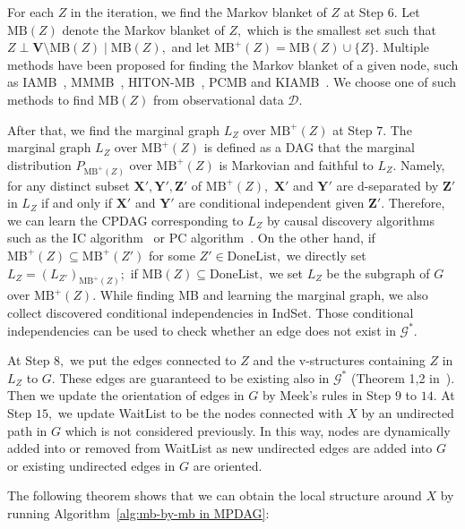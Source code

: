 \documentclass{article}
\begin{document}
For each $Z$ in the iteration, we find the Markov blanket of $Z$ at Step $6.$ Let $\mathrm{MB}(Z)$ denote the Markov blanket of $Z,$ which is the smallest set such that $Z\perp \mathbf{V}\setminus \mathrm{MB}(Z)\mid \mathrm{MB}(Z),$ and let $\mathrm{MB}^+(Z)=\mathrm{MB}(Z)\cup \{Z\}.$
Multiple methods have been proposed for finding the Markov blanket of a given node, such as IAMB~\citep{tsamardinos2003algorithms}, MMMB~\citep{tsamardinos2003time}, HITON-MB~\citep{aliferis2003hiton}, PCMB and KIAMB~\citep{pena2007towards}.
We choose one of such methods to find $\mathrm{MB}(Z)$ from observational data $\mathcal{D}.$

After that, we find the marginal graph $L_Z$ over $\mathrm{MB}^+(Z)$ at Step $7.$
The marginal graph $L_Z$ over $\mathrm{MB}^+(Z)$ is defined as a DAG that the marginal distribution $P_{\mathrm{MB}^+(Z)}$ over $\mathrm{MB}^+(Z)$ is Markovian and faithful to $L_Z.$
Namely, for any distinct subset $\mathbf{X}',\mathbf{Y}',\mathbf{Z}'$ of $\mathrm{MB}^+(Z),$ $\mathbf{X}'$ and $\mathbf{Y}'$ are d-separated by $\mathbf{Z}'$ in $L_Z$ if and only if $\mathbf{X}'$ and $\mathbf{Y}'$ are conditional independent given $\mathbf{Z}'$.
Therefore, we can learn the CPDAG corresponding to $L_Z$ by causal discovery algorithms such as the IC algorithm~\citep{pearl2000causality} or PC algorithm~\citep{spirtes2000causation}.
On the other hand, if $\mathrm{MB}^+(Z)\subseteq \mathrm{MB}^+(Z')$ for some $Z'\in \mathrm{DoneList},$ we directly set $L_Z=(L_{Z'})_{\mathrm{MB}^+(Z)};$ if $\mathrm{MB}(Z)\subseteq\mathrm{DoneList},$ we set $L_Z$ be the subgraph of $G$ over $\mathrm{MB}^+(Z).$
While finding MB and learning the marginal graph, we also collect discovered conditional independencies in IndSet.
Those conditional independencies can be used to check whether an edge does not exist in $\mathcal{G}^*.$

At Step $8,$ we put the edges connected to $Z$ and the v-structures containing $Z$ in $L_Z$ to $G.$
These edges are guaranteed to be existing also in $\mathcal{G}^*$ (Theorem 1,2 in~\citep{wang2014discovering}).
Then we update the orientation of edges in $G$ by Meek's rules in Step $9$ to $14$.
At Step $15,$ we update WaitList to be the nodes connected with $X$ by an undirected path in $G$ which is not considered previously.
In this way, nodes are dynamically added into or removed from WaitList as new undirected edges are added into $G$ or existing undirected edges in $G$ are oriented.

The following theorem shows that we can obtain the local structure around $X$ by running Algorithm~\ref{alg:mb-by-mb in MPDAG}:
\end{document}
